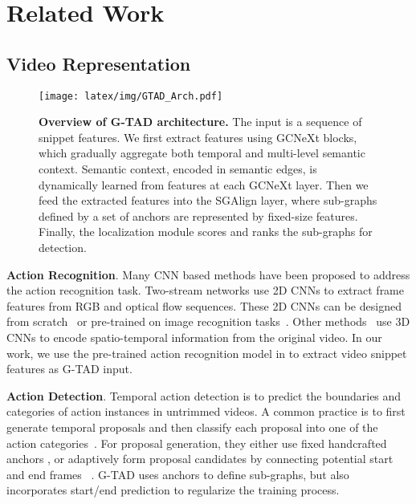 \documentclass[10pt,twocolumn,letterpaper]{article}
\begin{document}
 \section{Related Work}
\subsection{Video Representation}
\begin{figure*}
    \centering
    \texttt{[image: latex/img/GTAD\_Arch.pdf]}
    \caption{\textbf{Overview of G-TAD architecture.} The input is a sequence of snippet features. We first extract features using  GCNeXt blocks, which gradually aggregate both temporal and multi-level semantic context. Semantic context, encoded in semantic edges, is dynamically learned from features at each GCNeXt layer. 
   Then we feed the extracted features into the  SGAlign layer, where sub-graphs defined by a set of anchors are represented by fixed-size features. 
Finally, the localization module scores and ranks the sub-graphs for detection. 
}
    \label{fig:arch}
\end{figure*}

\noindent \textbf{Action Recognition}. Many CNN based methods have been proposed to address the action recognition task. Two-stream networks \cite{feichtenhofer2016convolutional,simonyan2014two,wang2015towards} use 2D CNNs to extract frame features from RGB and optical flow sequences.  
These 2D CNNs can be designed from scratch~\cite{he2016deep, simonyan2014very} or pre-trained on image recognition tasks~\cite{deng2009imagenet}. Other methods~\cite{tran2015learning,carreira2017quo,qiu2017learning,xu2017r} use 3D CNNs to encode spatio-temporal information from the original video. In our work, we use the pre-trained action recognition model in \cite{xiong2016cuhk,wang2016temporal} to extract video snippet features as G-TAD input.





\noindent \textbf{Action Detection}. Temporal action detection is to predict the boundaries and categories of action instances  in untrimmed videos. A common practice is to first generate temporal proposals and then classify each proposal into one of the action categories~\cite{shou2016temporal,singh2016untrimmed,zhao2017temporal, zeng2019graph, chao2018rethinking, lin2018bsn}.
For proposal generation, they either use fixed handcrafted anchors \cite{buch2017sst,caba2016fast, escorcia2016daps, gao2017turn,shou2016temporal} , or adaptively form proposal candidates by connecting potential start and end frames
~\cite{zhao2017temporal,lin2018bsn}. 
G-TAD uses anchors to define sub-graphs, but also incorporates start/end prediction to regularize the training process. 
\end{document}
